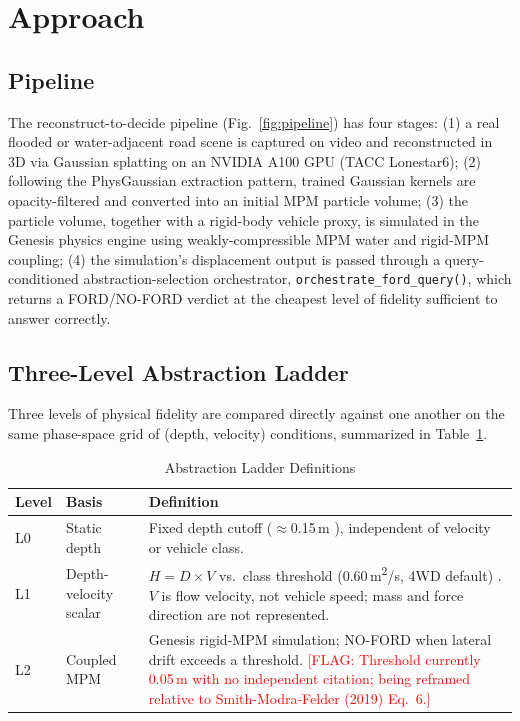 \documentclass[conference]{IEEEtran}
\newcommand{\FLAG}[1]{\textcolor{red}{[FLAG: #1]}}
\begin{document}
\section{Approach}
\label{sec:approach}

\subsection{Pipeline}
The reconstruct-to-decide pipeline (Fig.~\ref{fig:pipeline}) has four stages: (1) a real flooded or water-adjacent road scene is captured on video and reconstructed in 3D via Gaussian splatting on an NVIDIA A100 GPU (TACC Lonestar6); (2) following the PhysGaussian extraction pattern, trained Gaussian kernels are opacity-filtered and converted into an initial MPM particle volume; (3) the particle volume, together with a rigid-body vehicle proxy, is simulated in the Genesis physics engine using weakly-compressible MPM water and rigid-MPM coupling; (4) the simulation's displacement output is passed through a query-conditioned abstraction-selection orchestrator, \texttt{orchestrate\_ford\_query()}, which returns a FORD/NO-FORD verdict at the cheapest level of fidelity sufficient to answer correctly.

\subsection{Three-Level Abstraction Ladder}
Three levels of physical fidelity are compared directly against one another on the same phase-space grid of (depth, velocity) conditions, summarized in Table~\ref{tab:ladder}.

\begin{table}[t]
\caption{Abstraction Ladder Definitions}
\label{tab:ladder}
\centering
\begin{tabular}{@{}p{0.3in}p{0.85in}p{1.95in}@{}}
\toprule
\textbf{Level} & \textbf{Basis} & \textbf{Definition} \\
\midrule
L0 & Static depth & Fixed depth cutoff ($\approx$0.15\,m \cite{nws_tadd}), independent of velocity or vehicle class. \\
L1 & Depth-velocity scalar & $H = D \times V$ vs.\ class threshold (0.60\,m\textsuperscript{2}/s, 4WD default) \cite{shand2011}. $V$ is flow velocity, not vehicle speed; mass and force direction are not represented. \\
L2 & Coupled MPM & Genesis rigid-MPM simulation; NO-FORD when lateral drift exceeds a threshold. \FLAG{Threshold currently 0.05\,m with no independent citation; being reframed relative to Smith-Modra-Felder (2019) Eq.~6.} \\
\bottomrule
\end{tabular}
\end{table}
\end{document}
